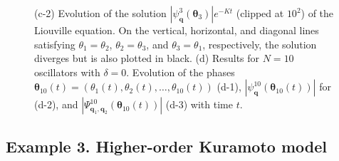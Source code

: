 \documentclass[
amsmath,amssymb,
]{revtex4-2}
\begin{document}
\begin{figure}
{    (c-2) Evolution of the solution $\left|\psi^3_{\bm{q}}({\bm \theta}_3)\right|e^{-Kt}$ (clipped at $10^2$) of the Liouville equation. On the vertical, horizontal, and diagonal lines satisfying $\theta_1 = \theta_2$, $\theta_2 = \theta_3$, and $\theta_3 = \theta_1$, respectively, the solution diverges but is also plotted in black.
    (d) Results for $N=10$ oscillators with $\delta = 0$.
    Evolution of the phases ${\bm \theta}_{10}(t)= (\theta_1(t), \theta_2(t), \ldots, \theta_{10}(t))$ (d-1),
    $\left|\psi^{10}_{\bm{q}}({\bm \theta}_{10}(t))\right|$ for  
    (d-2),
    and $\left|\Psi^{10}_{\bm{q}_1,\bm{q}_2}({\bm \theta}_{10}(t))\right|$
    (d-3) with time $t$.
    }
    \label{fig:Kuramoto--Sakaguchi_model}
\end{figure}

\subsection{Example 3. Higher-order Kuramoto model}
\end{document}
